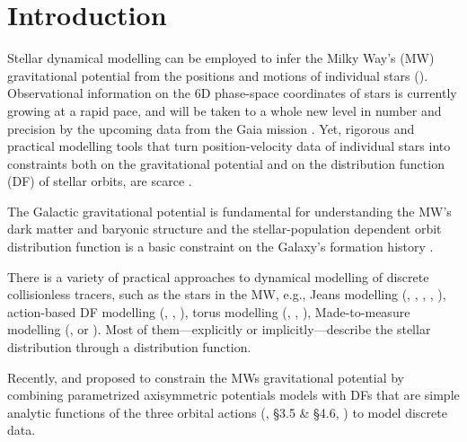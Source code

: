 \section{Introduction} \label{sec:intro}

Stellar dynamical modelling can be employed to infer the Milky Way's (MW) gravitational potential from the positions and motions of individual stars (\citealt{2008gady.book.....B,2011Prama..77...39B,2013A&ARv..21...61R}). Observational information on the 6D phase-space coordinates of stars is currently growing at a rapid pace, and will be taken to a whole new level in number and precision by the upcoming data from the Gaia mission \citep{2001A&A...369..339P}. Yet, rigorous and practical modelling tools that turn position-velocity data of individual stars into constraints both on the gravitational potential and on the distribution function (DF) of stellar orbits, are scarce \citep{2013A&ARv..21...61R}.

The Galactic gravitational potential is fundamental for understanding the MW's dark matter and baryonic structure \citep{2013A&ARv..21...61R,2012EPJWC..1910002M,2013PhR...531....1S,2014JPhG...41f3101R} and the stellar-population dependent orbit distribution function is a basic constraint on the Galaxy's formation history \citep{2013NewAR..57...29B,2013A&ARv..21...61R,2015MNRAS.449.3479S}.

There is a variety of practical approaches to dynamical modelling of discrete collisionless tracers, such as the stars in the MW, e.g., Jeans modelling (\citealt{1989MNRAS.239..605K}, \citealt{2012ApJ...756...89B}, \citealt{2012MNRAS.425.1445G}, \citealt{2013ApJ...772..108Z}, \citealt{2015MNRAS.452..956B}), action-based DF modelling (\citealt{2013ApJ...779..115B}, \citealt{2014MNRAS.445.3133P}, \citealt{2015MNRAS.449.3479S}), torus modelling (\citealt{2008MNRAS.390..429M}, \citealt{2012MNRAS.419.2251M}, \citealt{2013MNRAS.433.1411M}), Made-to-measure modelling (\citealt{sye96}, \citealt{2007MNRAS.376...71D} or \citealt{2014MNRAS.443.2112H}). Most of them---explicitly or implicitly---describe the stellar distribution through a distribution function. 

Recently, \citet{2012MNRAS.426.1328B} and \citet{2013ApJ...779..115B}  proposed to constrain the MWs gravitational potential by combining parametrized axisymmetric potentials models with DFs that are simple analytic functions of the three orbital actions (\citealt{2008gady.book.....B}, \S 3.5 \& \S 4.6, \citealt{2011Prama..77...39B}) to model discrete data.



